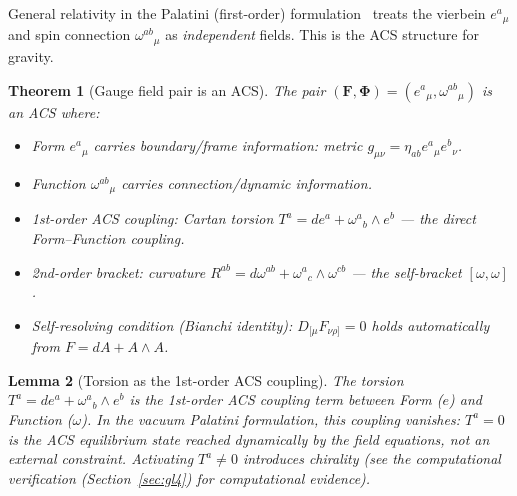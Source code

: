 \documentclass[11pt,a4paper]{article}
\theoremstyle{plain}
\newtheorem{theorem}{Theorem}[section]
\newtheorem{lemma}[theorem]{Lemma}
\theoremstyle{definition}
\theoremstyle{remark}
\newcommand{\FormF}{\mathbf{F}}
\newcommand{\FuncF}{\boldsymbol{\Phi}}
\begin{document}
General relativity in the Palatini (first-order) formulation~\cite{Palatini1919} treats the 
vierbein $e^a{}_\mu$ and spin connection $\omega^{ab}{}_\mu$ as \emph{independent} 
fields.  This is the ACS structure for gravity.

\begin{theorem}[Gauge field pair is an ACS]\label{thm:gravity-acs}
The pair $(\FormF, \FuncF) = (e^a{}_\mu, \omega^{ab}{}_\mu)$ is an ACS where:
\begin{itemize}[noitemsep]
  \item Form $e^a{}_\mu$ carries boundary/frame information: metric $g_{\mu\nu} = \eta_{ab}e^a{}_\mu e^b{}_\nu$.
  \item Function $\omega^{ab}{}_\mu$ carries connection/dynamic information.
  \item 1st-order ACS coupling: Cartan torsion 
    $T^a = de^a + \omega^a{}_b \wedge e^b$ --- the direct Form--Function coupling.
  \item 2nd-order bracket: curvature 
    $R^{ab} = d\omega^{ab} + \omega^a{}_c \wedge \omega^{cb}$ --- the self-bracket $[\omega,\omega]$.
  \item Self-resolving condition (Bianchi identity): 
    $D_{[\mu}F_{\nu\rho]} = 0$ holds automatically from $F = dA + A\wedge A$.
\end{itemize}
\end{theorem}

\begin{lemma}[Torsion as the 1st-order ACS coupling]\label{lem:torsion}\label{thm:C2-closed}
The torsion $T^a = de^a + \omega^a{}_b \wedge e^b$ is the \emph{1st-order
ACS coupling term} between Form ($e$) and Function ($\omega$).  In the
vacuum Palatini formulation, this coupling vanishes: $T^a = 0$ is the
\emph{ACS equilibrium state} reached dynamically by the field equations,
not an external constraint.  Activating $T^a\neq 0$ introduces chirality
(see the computational verification (Section~\ref{sec:gl4}) for computational evidence).
\end{lemma}
\end{document}
